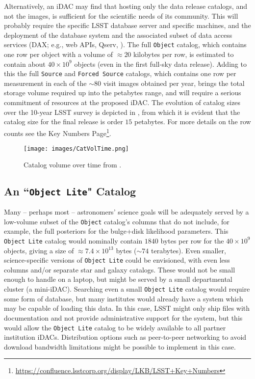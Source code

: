 Alternatively, an iDAC may find that hosting only the data release catalogs, and not the images, is sufficient for the scientific needs of its community. This will probably require the specific LSST database server  and specific machines, and the deployment of the database system and the associated subset of data access services (DAX; e.g., web APIs, Qserv, ). The full {\tt Object} catalog, which contains one row per object with a volume of $\approx 20$ kilobytes per row, is estimated to contain about $40 \times 10^9$ objects (even in the first full-sky data release). Adding to this the full {\tt Source} and {\tt Forced Source} catalogs, which contains one row per measurement in each of the $\sim80$ visit images obtained per year, brings the total storage volume required up into the petabytes range, and will require a serious commitment of resources at the proposed iDAC. The evolution of catalog sizes over the 10-year LSST survey is depicted in , from which it is evident that the catalog size for the final release is order $15$ petabytes. For more details on the row counts see the Key Numbers Page\footnote{\url{https://confluence.lsstcorp.org/display/LKB/LSST+Key+Numbers}}.

\begin{figure}
\begin{center}
\texttt{[image: images/CatVolTime.png]}
\caption{Catalog volume over time from . \label{fig:catvol}}
\end{center}
\end{figure}

\subsection{An ``{\tt Object Lite}" Catalog}

Many -- perhaps most -- astronomers' science goals will be adequately served by a low-volume subset of the {\tt Object} catalog's columns that do not include, for example, the full posteriors for the bulge+disk likelihood parameters. This {\tt Object Lite} catalog would nominally contain $1840$ bytes per row for the $40 \times 10^{9}$ objects, giving a size of $\approx 7.4 \times 10^{13}$ bytes ($\sim74$ terabytes). Even smaller, science-specific versions of {\tt Object Lite} could be envisioned, with even less columns and/or separate star and galaxy catalogs. These would not be small enough to handle on a laptop, but might be served by a small departmental cluster (a mini-iDAC). Searching even a small {\tt Object Lite} catalog would require some form of database, but many institutes would already have a system which may be capable of loading this data. In this case, LSST might only ship files with documentation and not provide administrative support for the system, but this would allow the {\tt Object Lite} catalog to be widely available to all partner institution iDACs. Distribution options such as peer-to-peer networking to avoid download bandwidth limitations might be possible to implement in this case.